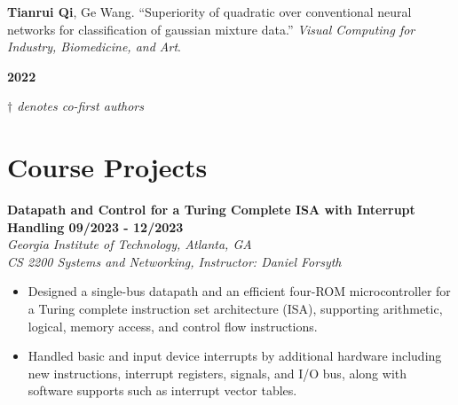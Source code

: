 \documentclass[letterpaper, 11pt]{article}
\newcommand{\subsectionvspace}{\vspace{8pt}}
\begin{document}
    \subsectionvspace

    \begin{minipage}[t]{0.9\textwidth} 
        \textbf{Tianrui Qi}, Ge Wang. 
        ``Superiority of quadratic over conventional neural networks for classification of gaussian mixture data.'' 
        \textit{Visual Computing for Industry, Biomedicine, and Art}.
    \end{minipage}%
    \begin{minipage}[t]{0.1\textwidth} \raggedleft
        \textbf{2022}
    \end{minipage}

    \subsectionvspace

    \textit{$\dag$ denotes co-first authors}


\section{Course Projects}




    \textbf{Datapath and Control for a Turing Complete ISA with Interrupt Handling \hfill 09/2023 - 12/2023} \\
    \textit{Georgia Institute of Technology, Atlanta, GA} \\
    \textit{CS 2200 Systems and Networking, Instructor: Daniel Forsyth}
    \begin{itemize}
        \item Designed a single-bus datapath and an efficient four-ROM microcontroller for a Turing complete instruction set architecture (ISA), supporting arithmetic, logical, memory access, and control flow instructions.
        \item Handled basic and input device interrupts by additional hardware including new instructions, interrupt registers, signals, and I/O bus, along with software supports such as interrupt vector tables.
    \end{itemize}
\end{document}
